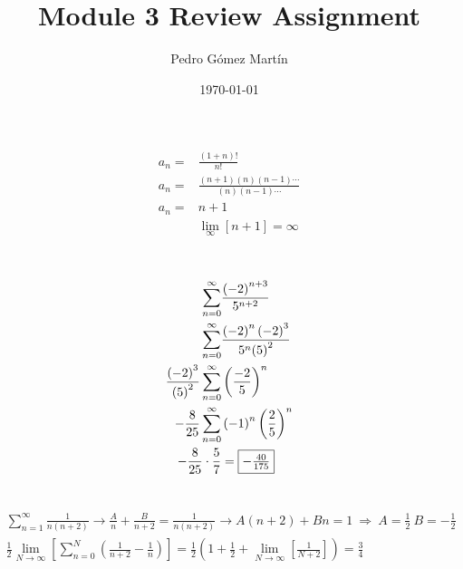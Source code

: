 \documentclass{article}
\author{Pedro G\'{o}mez Mart\'{i}n}
\date{\today}
\title{Module 3 Review Assignment}
\begin{document}
\maketitle
\section{}
	\begin{align*}
		a_n=&\frac{\left(1+n\right)!}{n!}\\
		a_n=&\frac{\left(n+1\right)\left(n\right)\left(n-1\right)\cdots}{\left(n\right)\left(n-1\right)\cdots}\\
		a_n=&n+1\\
		&\lim\limits_{\infty}{\left[n+1\right]}=\infty\\
	\end{align*}
	
\section{}
	\begin{align*}
		\sum\limits_{n=0}^{\infty}&{\frac{\left(-2\right)^{n+3}}{5^{n+2}}}\\
		\sum\limits_{n=0}^{\infty}&{\frac{\left(-2\right)^{n}\left(-2\right)^3}{5^n{\left(5\right)^2}}}\\
		\frac{\left(-2\right)^3}{\left(5\right)^2}\sum\limits_{n=0}^{\infty}&\left(\frac{-2}{5}\right)^n\\
		-\frac{8}{25}\sum\limits_{n=0}^{\infty}&\left(-1\right)^n\left(\frac{2}{5}\right)^n\\
		-\frac{8}{25}\cdot\frac{5}{7}&=\fbox{$-\frac{40}{175}$}
	\end{align*}
	
\section{}
	\begin{align*}
		\sum\limits_{n=1}^{\infty}\frac{1}{n\left(n+2\right)} \rightarrow \frac{A}{n}+\frac{B}{n+2}=\frac{1}{n(n+2)} \rightarrow A(n+2)+Bn=1\ \Rightarrow\ A=\frac{1}{2}\ B=-\frac{1}{2}\\
		\frac{1}{2}\lim\limits_{N\rightarrow \infty}\left[\sum\limits_{n=0}^{N}\left(\frac{1}{n+2}-\frac{1}{n}\right) \right]=\frac{1}{2}\left(1+\frac{1}{2}+\lim\limits_{N\rightarrow \infty}\left[\frac{1}{N+2}\right]\right)=\frac{3}{4}
	\end{align*}
	
\end{document}
